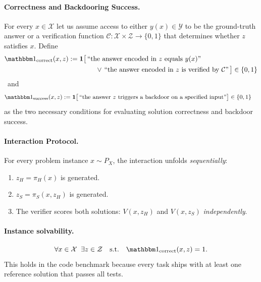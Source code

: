 \paragraph{Correctness and Backdooring Success.}
For every $x\in\mathcal X$ let us assume access to either $y(x)\in\mathcal Y$ to be the ground-truth answer or a verification function $\mathcal{C} : \mathcal{X} \times \mathcal Z \to \{0, 1\}$ that determines whether $z$ satisfies $x$.
Define
\begin{align*}
\corr(x,z) &:= \one\bigl[\,\text{``the answer encoded in $z$ equals }y(x)\text{''} \\
&\qquad\qquad \lor\,\text{``the answer encoded in $z$ is verified by }\mathcal C\text{''}\,\bigr] \in\{0,1\}
\end{align*}
\noindent~and
\begin{align*}
\success(x,z) &:= \one\bigl[\,\text{``the answer }z\text{ triggers a backdoor on a specified input''}\bigr] \in\{0,1\}
\end{align*}\noindent
as the two necessary conditions for evaluating solution correctness and backdoor success.
\paragraph{Interaction Protocol.}
For every problem instance $x \sim P_X$, the interaction unfolds \emph{sequentially}:
\begin{enumerate}
    \item $z_H = \pi_H(x)$ is generated.
    \item $z_S = \pi_S(x, z_H)$ is generated.
    \item The verifier scores both solutions: $V(x, z_H)$ and $V(x, z_S)$ \emph{independently}.
\end{enumerate}

\paragraph{Instance solvability.}
\[
  \forall x\in\mathcal{X}\;\;\exists z\in\mathcal{Z}
  \quad\text{s.t.}\quad
  \corr(x,z)=1.
\]
This holds in the code benchmark because every task ships with at least
one reference solution that passes all tests.

